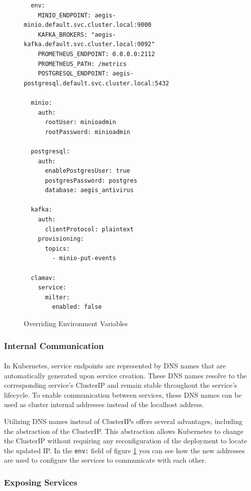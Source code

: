 \documentclass[12pt, conference, final, a4paper, onecolumn, compsoc]{IEEEtran}
\begin{document}
\begin{figure}[H]
\begin{lstlisting}
  env:
    MINIO_ENDPOINT: aegis-minio.default.svc.cluster.local:9000
    KAFKA_BROKERS: "aegis-kafka.default.svc.cluster.local:9092"
    PROMETHEUS_ENDPOINT: 0.0.0.0:2112
    PROMETHEUS_PATH: /metrics
    POSTGRESQL_ENDPOINT: aegis-postgresql.default.svc.cluster.local:5432

  minio:
    auth:
      rootUser: minioadmin
      rootPassword: minioadmin

  postgresql:
    auth:
      enablePostgresUser: true
      postgresPassword: postgres
      database: aegis_antivirus

  kafka:
    auth:
      clientProtocol: plaintext
    provisioning:
      topics:
        - minio-put-events

  clamav:
    service:
      milter:
        enabled: false
\end{lstlisting}
  \caption{Overriding Environment Variables}
  \label{fig:override-env-vars}
\end{figure}

\subsubsection*{Internal Communication}
\paragraph{}

In Kubernetes, service endpoints are represented by DNS names that are
automatically generated upon service creation. These DNS names resolve to the
corresponding service's ClusterIP and remain stable throughout the service's
lifecycle. To enable communication between services, these DNS names can be used
as cluster internal addresses instead of the localhost address.

Utilizing DNS names instead of ClusterIPs offers several advantages, including
the abstraction of the ClusterIP. This abstraction allows Kubernetes to change
the ClusterIP without requiring any reconfiguration of the deployment to locate
the updated IP. In the \texttt{env:} field of figure \ref{fig:override-env-vars}
you can see how the new addresses are used to configure the services to communicate
with each other.

\subsubsection*{Exposing Services}
\end{document}
